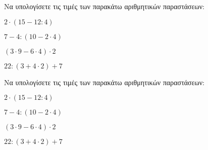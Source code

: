 Να υπολογίσετε τις τιμές των παρακάτω αριθμητικών παραστάσεων:
\begin{alist}
\item $ 2\cdot(15-12:4) $
\item $ 7-4:(10-2\cdot 4) $
\item $ (3\cdot 9-6\cdot 4)\cdot 2 $
\item $ 22:(3+4\cdot 2)+7 $
\end{alist}
Να υπολογίσετε τις τιμές των παρακάτω αριθμητικών παραστάσεων:
\begin{alist}
\item $ 2\cdot(15-12:4) $
\item $ 7-4:(10-2\cdot 4) $
\item $ (3\cdot 9-6\cdot 4)\cdot 2 $
\item $ 22:(3+4\cdot 2)+7 $
\end{alist}

